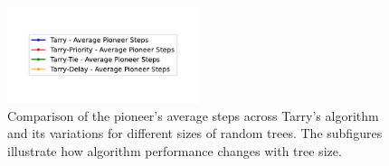 \begin{figure}[H]
    \centering
    \qquad
    \qquad
    \includegraphics[width=0.5\textwidth]{Cap3/tarry_var_steps_legend.pdf}
    \newline
    \qquad
    \newline
    \qquad
    \caption{Comparison of the pioneer's average steps across Tarry's algorithm and its variations for different sizes of random trees. The subfigures illustrate how algorithm performance changes with tree size.} 
    \label{fig_tarry_steps_all_sizes_tree} 
\end{figure}

